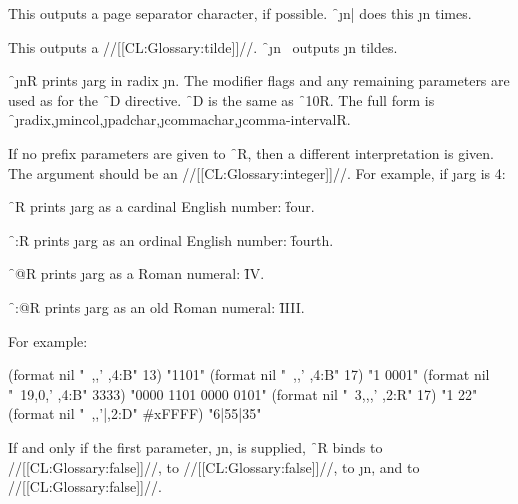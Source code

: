 This outputs a page separator character, if possible. \f{~\j{n}|} does this \j{n} times.

\endsubsubsection%

 

This outputs a //[[CL:Glossary:tilde]]//.  \f{~\j{n}~} outputs \j{n} tildes.

\endsubsubsection%

\endsubsection%


 

\f{~\j{n}R} prints \j{arg} in radix \j{n}. The modifier flags and any remaining parameters are used as for the \f{~D} directive. \f{~D} is the same as \f{~10R}.   The full form is  \f{~\j{radix},\j{mincol},\j{padchar},\j{commachar},\j{comma-interval}R}.

If no prefix parameters are given to \f{~R}, then a different interpretation is given.  The argument should be an //[[CL:Glossary:integer]]//. For example, if \j{arg} is 4:

\beginlist \itemitem{\bull} \f{~R} prints \j{arg} as a cardinal English number: \f{four}.

\itemitem{\bull} \f{~:R} prints \j{arg} as an ordinal English number: \f{fourth}.

\itemitem{\bull}    \f{~@R} prints \j{arg} as a Roman numeral: \f{IV}.

\itemitem{\bull}       \f{~:@R} prints \j{arg} as an old Roman numeral: \f{IIII}. \endlist

 For example:

\code
 (format nil "~,,' ,4:B" 13) \EV "1101"
 (format nil "~,,' ,4:B" 17) \EV "1 0001"
 (format nil "~19,0,' ,4:B" 3333) \EV "0000 1101 0000 0101"
 (format nil "~3,,,' ,2:R" 17) \EV "1 22"
 (format nil "~,,'|,2:D" #xFFFF) \EV  "6|55|35" \endcode

 If and only if the first parameter, \j{n}, is supplied, \f{~R} binds
      to //[[CL:Glossary:false]]//,
      to //[[CL:Glossary:false]]//, 
      to \j{n}, 
 and  to //[[CL:Glossary:false]]//.

